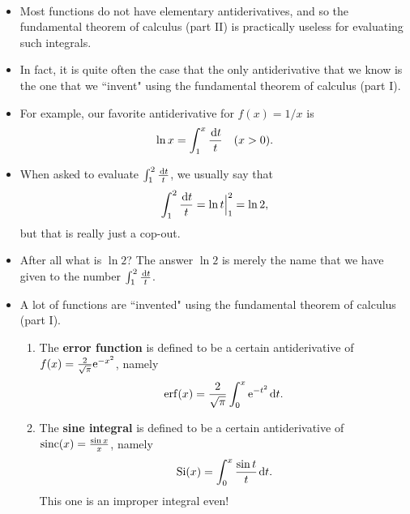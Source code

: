 \setcounter{chapter}{8}
\setcounter{section}{7}
\setcounter{theorem}{0}
\setcounter{equation}{0}


\vspace{-12pt}

\begin{remark}\,
\begin{itemize}
\item 
Most functions do not have elementary antiderivatives, and so the fundamental theorem of calculus (part II) is practically useless for evaluating such integrals.
\item In fact, it is quite often the case that the only antiderivative that we know is the one that we ``invent" using the fundamental theorem of calculus (part I).
\item For example, our favorite antiderivative for $f(x)=1/x$ is 
\begin{equation*}
\ln x = \int_1^x\frac{\mkern 2mu \mathrm{d} t}{t} \quad (x>0).
\end{equation*}
\item When asked to evaluate $\int_1^2\frac{\mkern 2mu \mathrm{d} t}{t}$, we usually say that
\begin{equation*}
\int_1^2\frac{\mkern 2mu \mathrm{d} t}{t} = \ln t\Big|_1^2 = \ln 2,
\end{equation*}
but that is really just a cop-out. 
\item After all what is $\ln 2$?  The answer $\ln 2$ is merely the name that we have given to the number 
$\int_1^2\frac{\mkern 2mu \mathrm{d} t}{t}$.
\item A lot of functions are ``invented" using the fundamental theorem of calculus (part I).
\begin{enumerate}
\item The \textbf{error function} is defined to be a certain antiderivative of $f(x) = \frac{2}{\sqrt\pi}\mathrm{e}^{-x^2}$, namely
\begin{equation*}
\operatorname{erf} (x) = \frac{2}{\sqrt\pi}\int_0^x\mathrm{e}^{-t^2}\mkern 2mu \mathrm{d} t.
\end{equation*}
\item The \textbf{sine integral} is defined to be a certain antiderivative of $\operatorname{sinc}(x) = \frac{\sin x}{x}$, namely
\begin{equation*}
\operatorname{Si}(x) = \int_0^x\frac{\sin t}{t}\mkern 2mu \mathrm{d} t.
\end{equation*}
This one is an improper integral even!

\end{enumerate}
\end{itemize}
\end{remark}
